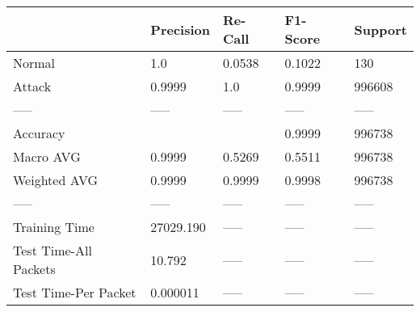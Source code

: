 \begin{tabular}{lllll}
\toprule
{} &  Precision & Re-Call & F1-Score & Support \\
\midrule
Normal                &        1.0 &  0.0538 &   0.1022 &     130 \\
Attack                &     0.9999 &     1.0 &   0.9999 &  996608 \\
-----                 &      ----- &   ----- &    ----- &   ----- \\
Accuracy              &            &         &   0.9999 &  996738 \\
Macro AVG             &     0.9999 &  0.5269 &   0.5511 &  996738 \\
Weighted AVG          &     0.9999 &  0.9999 &   0.9998 &  996738 \\
-----                 &      ----- &   ----- &    ----- &   ----- \\
Training Time         &  27029.190 &   ----- &    ----- &   ----- \\
Test Time-All Packets &     10.792 &   ----- &    ----- &   ----- \\
Test Time-Per Packet  &   0.000011 &   ----- &    ----- &   ----- \\
\bottomrule
\end{tabular}
